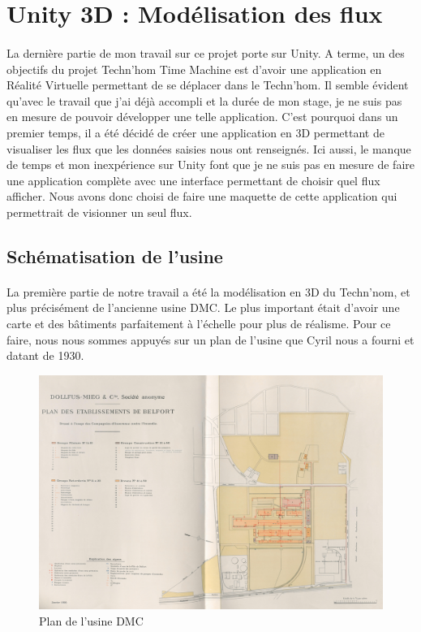 \section{Unity 3D : Modélisation des flux}

\paragraph{} \hspace{10mm}
La dernière partie de mon travail sur ce projet porte sur Unity. A terme, un des objectifs du projet Techn'hom Time Machine est d'avoir une application en Réalité Virtuelle permettant de se déplacer dans le Techn'hom. Il semble évident qu'avec le travail que j'ai déjà accompli et la durée de mon stage, je ne suis pas en mesure de pouvoir développer une telle application. C'est pourquoi dans un premier temps, il a été décidé de créer une application en 3D permettant de visualiser les flux que les données saisies nous ont renseignés. Ici aussi, le manque de temps et mon inexpérience sur Unity font que je ne suis pas en mesure de faire une application complète avec une interface permettant de choisir quel flux afficher. Nous avons donc choisi de faire une maquette de cette application qui permettrait de visionner un seul flux.

\subsection{Schématisation de l'usine}

\paragraph{} \hspace{10mm}
La première partie de notre travail a été la modélisation en 3D du Techn'nom, et plus précisément de l'ancienne usine DMC. Le plus important était d'avoir une carte et des bâtiments parfaitement à l'échelle pour plus de réalisme. Pour ce faire, nous nous sommes appuyés sur un plan de l'usine que Cyril nous a fourni et datant de 1930.

\begin{figure} [H]
    \centering
    \includegraphics[width=1\textwidth]{assets/unity/schema_usine_dmc.jpg}
    \caption{Plan de l'usine DMC}
    \label{fig:planDMC}
\end{figure}

